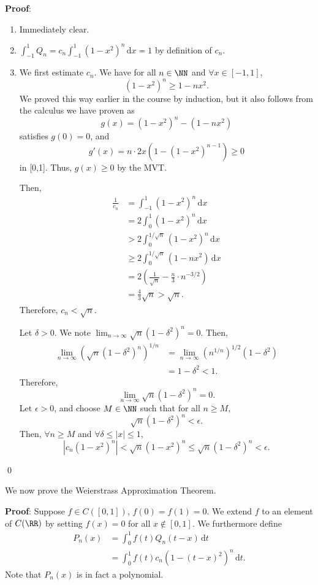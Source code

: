 \noindent \textbf{Proof}: 
\begin{enumerate}
    \item[2.] Immediately clear.
    \item[1.] $\int_{-1}^1 Q_n = c_n \int_{-1}^1 (1-x^2)^{n}\,\mathrm dx = 1$ by definition of $c_n$.
    \item[3.] We first estimate $c_n$. We have for all $n\in\NN$ and $\forall x\in[-1,1]$,
    \[
    (1-x^2)^n \geq 1-nx^2.
    \]
    We proved this way earlier in the course by induction, but it also follows from the calculus we have proven as 
    \[
    g(x) = (1-x^2)^n - (1-nx^2)
    \]
    satisfies $g(0) = 0$, and
    \[
    g'(x) = n\cdot 2x(1-(1-x^2)^{n-1})\geq 0
    \]
    in [0,1]. Thus, $g(x)\geq 0$ by the MVT.
    
    Then,
    \begin{align*}
        \frac{1}{c_n} &= \int_{-1}^1 (1-x^2)^n\,\mathrm dx \\
        &= 2\int_0^1 (1-x^2)^n \,\mathrm dx \\
        &> 2\int_0^{1/\sqrt{n}}(1-x^2)^n \,\mathrm dx \\
        &\geq 2\int_0^{1/\sqrt{n}} (1-nx^2)\,\mathrm dx \\
        &= 2\left(\frac{1}{\sqrt n} - \frac{n}{3}\cdot n^{-3/2}\right) \\
        &= \frac{4}{3} \sqrt{n} >\sqrt{n}.
    \end{align*}
    Therefore, $c_n< \sqrt{n}$.
    
    Let $\delta>0$. We note $\lim_{n\to \infty} \sqrt{n}(1-\delta^2)^n = 0$. Then, 
    \begin{align*}
        \lim_{n\to \infty} (\sqrt{n}(1-\delta^2)^n)^{1/n} &= \lim_{n\to \infty}(n^{1/n})^{1/2}(1-\delta^2)\\
        &= 1-\delta^2<1.
    \end{align*}
    Therefore, 
    \[
    \lim_{n\to \infty} \sqrt{n}(1-\delta^2)^n = 0.
    \]
    Let $\epsilon>0$, and choose $M\in \NN$ such that for all $n\geq M$,
    \[
    \sqrt{n}(1-\delta^2)^n <\epsilon.
    \]
    Then, $\forall n\geq M$ and $\forall \delta\leq |x|\leq 1$, 
    \[
    |c_n(1-x^2)^n| < \sqrt{n}(1-x^2)^n \leq \sqrt{n}(1-\delta^2)^n <\epsilon.
    \]
\end{enumerate}\qed 

We now prove the Weierstrass Approximation Theorem.

\noindent\textbf{Proof}: Suppose $f\in C([0,1])$, $f(0) = f(1) = 0$. We extend $f$ to an element of $C(\RR)$ by setting $f(x) = 0$ for all $x\notin [0,1]$. We furthermore define 
\begin{align*}
    P_n(x) &= \int_0^1 f(t)Q_{n}(t-x)\,\mathrm dt \\
    &= \int_0^1 f(t) c_n(1-(t-x)^2)^n \,\mathrm dt.
\end{align*}
Note that $P_n(x)$ is in fact a polynomial.

